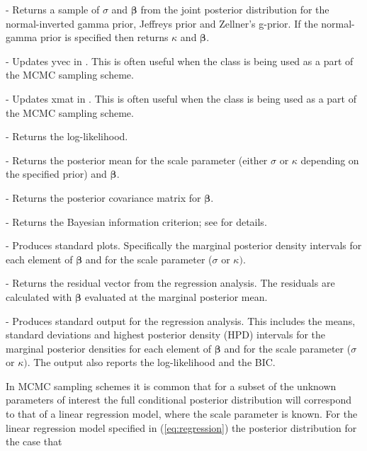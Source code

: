 \documentclass[article]{jss}
\begin{document}
\begin{description}
\item {} - Returns a sample of $\sigma$ and $\bm{\beta}$
  from the joint posterior distribution for the normal-inverted gamma
  prior, Jeffreys prior and Zellner's g-prior. If the normal-gamma
  prior is specified then  returns $\kappa$ and
  $\bm{\beta}.$
\item {} - Updates yvec in
  . This is often useful when the class is being
  used as a part of the MCMC sampling scheme.
\item {} - Updates xmat in
  . This is often useful when the class is being
  used as a part of the MCMC sampling scheme.
\item {} - Returns the log-likelihood.
\item {} - Returns the posterior mean for the
  scale parameter (either $\sigma$ or $\kappa$ depending on the
  specified prior) and $\bm{\beta}.$
\item {} - Returns the posterior
  covariance matrix for $\bm{\beta}$.
\item {} - Returns the Bayesian information criterion; see
  \cite{KassRaftery1995} for details.
\item {} - Produces standard plots.
  Specifically the marginal posterior density intervals for each
  element of $\bm{\beta}$ and for the scale parameter ($\sigma$ or
  $\kappa)$.
\item {} - Returns the residual vector from the
  regression analysis.  The residuals are calculated with $\bm{\beta}$
  evaluated at the marginal posterior mean.
\item {} - Produces standard output for the regression
  analysis.  This includes the means, standard deviations and highest
  posterior density (HPD) intervals for the marginal posterior
  densities for each element of $\bm{\beta}$ and for the scale
  parameter ($\sigma$ or $\kappa)$. The output also reports the
  log-likelihood and the BIC.
\end{description}
In MCMC sampling schemes it is common that for a subset of the unknown
parameters of interest the full conditional posterior distribution
will correspond to that of a linear regression model, where the scale
parameter is known. For the linear regression model specified in
(\ref{eq:regression}) the posterior distribution for the case that
\end{document}
